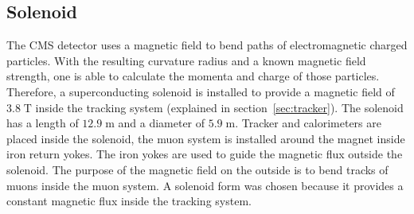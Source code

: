 \subsection{Solenoid}
	The CMS detector uses a magnetic field to bend paths of electromagnetic charged particles. With the resulting curvature radius and a known magnetic field strength, one is able to calculate the momenta and charge of those particles. Therefore, a superconducting solenoid is installed to provide a magnetic field of $3.8\;\text{T}$ inside the tracking system (explained in section~\ref{sec:tracker}). The solenoid has a length of $12.9\;\text{m}$ and a diameter of $5.9\;\text{m}$. Tracker and calorimeters are placed inside the solenoid, the muon system is installed around the magnet inside iron return yokes. The iron yokes are used to guide the magnetic flux outside the solenoid. The purpose of the magnetic field on the outside is to bend tracks of muons inside the muon system. A solenoid form was chosen because it provides a constant magnetic flux inside the tracking system.
	

